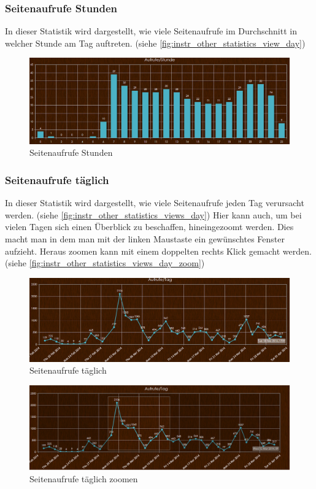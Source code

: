 \subsubsection{Seitenaufrufe Stunden}
In dieser Statistik wird dargestellt, wie viele Seitenaufrufe im Durchschnitt in welcher Stunde am Tag auftreten. (siehe \autoref{fig:instr_other_statistics_view_day})
\begin{figure}[H]
\centering
\includegraphics[keepaspectratio=true, width=14cm]{images/screenshots/statistics_views_hour.png}
\caption{Seitenaufrufe Stunden}
\label{fig:instr_other_statistics_view_day}
\end{figure}
\subsubsection{Seitenaufrufe täglich}
In dieser Statistik wird dargestellt, wie viele Seitenaufrufe jeden Tag verursacht werden. (siehe \autoref{fig:instr_other_statistics_views_day}) Hier kann auch, um bei vielen Tagen sich einen Überblick zu beschaffen, hineingezoomt werden. Dies macht man in dem man mit der linken Maustaste ein gewünschtes Fenster aufzieht. Heraus zoomen kann mit einem doppelten rechts Klick gemacht werden. (siehe \autoref{fig:instr_other_statistics_views_day_zoom})
\begin{figure}[H]
\centering
\includegraphics[keepaspectratio=true, width=14cm]{images/screenshots/statistics_views_day.png}
\caption{Seitenaufrufe täglich}
\label{fig:instr_other_statistics_views_day}
\end{figure}
\begin{figure}[H]
\centering
\includegraphics[keepaspectratio=true, width=14cm]{images/screenshots/statistics_views_day_zoom.png}
\caption{Seitenaufrufe täglich zoomen}
\label{fig:instr_other_statistics_views_day_zoom}
\end{figure}
